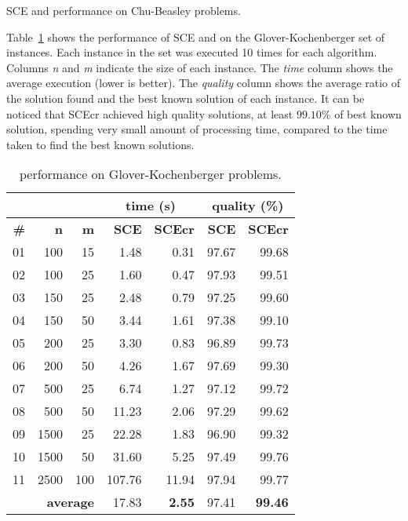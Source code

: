 \begin{table}
 \caption{SCE and \scecore  performance on Chu-Beasley problems.}
{
\renewcommand{\arraystretch}{1.3}%
\fontsize{8.5pt}{1em}\selectfont 
\begin{center}
  
\end{center}
}
 \label{tab:chu}
\end{table}

Table~\ref{tab:gk} shows the performance of SCE and \scecore on the Glover-Kochenberger set of instances.
Each instance in the set was executed 10 times for each algorithm.
Columns \textit{n} and \textit{m} indicate the size of each instance.
The \textit{time} column shows the average execution (lower is better).
The \textit{quality} column shows the average ratio of the solution found and
the best known solution of each instance.
It can be noticed that SCEcr achieved high quality solutions, at least $99.10\%$
of best known solution, spending very small amount of processing time, compared
to the time taken to find the best known solutions.

\begin{table}
 \caption{\scecore performance on Glover-Kochenberger problems.}
{
\renewcommand{\arraystretch}{1.7}%
\fontsize{8.5pt}{1em}\selectfont 
\begin{center}
\begin{tabular}{|r|r|r|r|r|r|r|} \cline{4-7}
		\multicolumn{3}{c|}{} & \multicolumn{2}{c|}{\bf time (s)} & \multicolumn{2}{c|}{\bf quality (\%)} \\ \hline
		\textbf{\#} & \textbf{n}   & \textbf{m}  & {\bf SCE } & {\bf SCEcr } & {\bf SCE} & {\bf SCEcr} \\ \hline
01 & 100 & 15 & 1.48   & 0.31 & 97.67 &  99.68 \\ \hline
02 & 100 & 25 & 1.60   & 0.47 & 97.93 &  99.51 \\ \hline
03 & 150 & 25 & 2.48   & 0.79 & 97.25 &  99.60 \\ \hline
04 & 150 & 50 & 3.44   & 1.61 & 97.38 &  99.10 \\ \hline
05 & 200 & 25 & 3.30   & 0.83 & 96.89 &  99.73 \\ \hline
06 & 200 & 50 & 4.26   & 1.67 & 97.69 &  99.30 \\ \hline
07 & 500 & 25 & 6.74   & 1.27 & 97.12 &  99.72 \\ \hline
08 & 500 & 50 & 11.23  & 2.06 & 97.29 &  99.62 \\ \hline
09 &1500 & 25 & 22.28  & 1.83 & 96.90 &  99.32 \\ \hline
10 &1500 & 50 & 31.60  & 5.25 & 97.49 &  99.76 \\ \hline
11 &2500 &100 &107.76  &11.94 & 97.94 & 99.77 \\ \hline
    \multicolumn{3}{|r|}{\textbf{average }} & {17.83} & \multicolumn{1}{r|}{\bf 2.55 } & {97.41} & {\bf 99.46}  \\ \hline
\end{tabular}
\end{center}
}
 \label{tab:gk}
\end{table}

